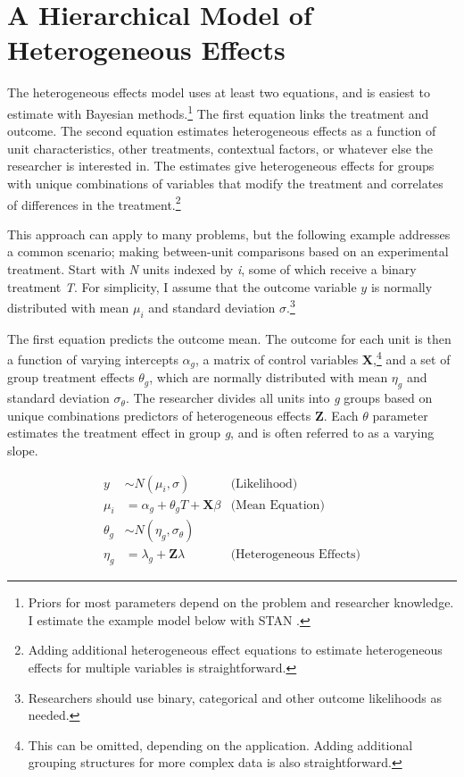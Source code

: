 \documentclass[12pt]{article}
\begin{document}
\section{A Hierarchical Model of Heterogeneous Effects}


The heterogeneous effects model uses at least two equations, and is easiest to estimate with Bayesian methods.\footnote{Priors for most parameters depend on the problem and researcher knowledge. I estimate the example model below with STAN \citep{Carpenteretal2016}.} 
The first equation links the treatment and outcome. 
The second equation estimates heterogeneous effects as a function of unit characteristics, other treatments, contextual factors, or whatever else the researcher is interested in. 
The estimates give heterogeneous effects for groups with unique combinations of variables that modify the treatment and correlates of differences in the treatment.\footnote{Adding additional heterogeneous effect equations to estimate heterogeneous effects for multiple variables is straightforward.}  


This approach can apply to many problems, but the following example addresses a common scenario; making between-unit comparisons based on an experimental treatment.    
Start with \textit{N} units indexed by \textit{i}, some of which receive a binary treatment \textit{T}.
For simplicity, I assume that the outcome variable ${y}$ is normally distributed with mean $\mu_i$ and standard deviation $\sigma$.\footnote{Researchers should use binary, categorical and other outcome likelihoods as needed.}


The first equation predicts the outcome mean. 
The outcome for each unit is then a function of varying intercepts $\alpha_g$, a matrix of control variables \textbf{X},\footnote{This can be omitted, depending on the application. Adding additional grouping structures for more complex data is also straightforward.} and a set of group treatment effects $\theta_g$, which are normally distributed with mean $\eta_g$ and standard deviation $\sigma_\theta$. 
The researcher divides all units into \textit{g} groups based on unique combinations predictors of heterogeneous effects \textbf{Z}. 
Each $\theta$ parameter estimates the treatment effect in group \textit{g}, and is often referred to as a varying slope. 


\begin{equation}
\begin{aligned}
y &\sim N(\mu_i, \sigma) &\text{(Likelihood)} \\
\mu_i &= \alpha_g + \theta_g \textit{T} + \textbf{X} \beta &\text{(Mean Equation)}  \\
\theta_g &\sim N(\eta_g, \sigma_\theta) \\ 
\eta_g &= \lambda_g + \textbf{Z} \lambda &\text{(Heterogeneous Effects)} 
\end{aligned}
\end{equation}
\end{document}
